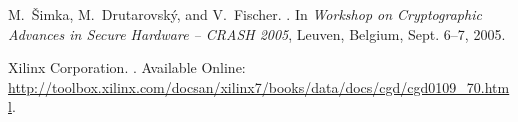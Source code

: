 \documentclass[conference]{IEEEtran}
\begin{document}
\begin{thebibliography}{10}
M.~\v{S}imka, M.~Drutarovsk\'y, and V.~Fischer.
.
\newblock In {\em Workshop on Cryptographic Advances in Secure Hardware --
  CRASH 2005}, Leuven, Belgium, Sept. 6--7, 2005.

{Xilinx Corporation}.
.
\newblock Available Online:
  \url{http://toolbox.xilinx.com/docsan/xilinx7/books/data/docs/cgd/cgd0109_70.html}.

\end{thebibliography}
\end{document}
